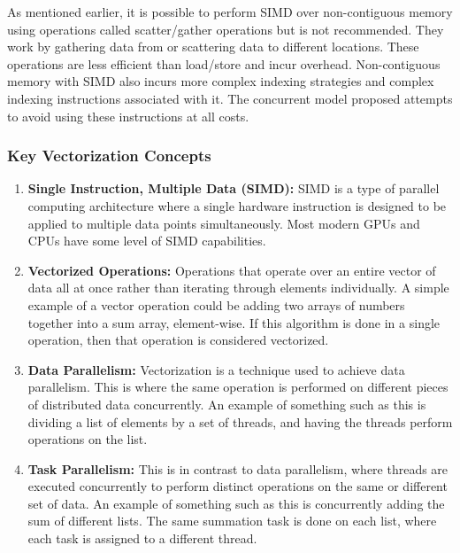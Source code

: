 As mentioned earlier, it is possible to perform SIMD over non-contiguous memory using operations called scatter/gather operations but is not recommended. They work by gathering data from or scattering data to different locations. These operations are less efficient than load/store and incur overhead. Non-contiguous memory with SIMD also incurs more complex indexing strategies and complex indexing instructions associated with it. The concurrent model proposed attempts to avoid using these instructions at all costs. \cite{Kusswurm_2022}

\subsubsection{Key Vectorization Concepts}
\begin{enumerate}
    \item \textbf{Single Instruction, Multiple Data (SIMD):} SIMD is a type of parallel computing architecture where a single hardware instruction is designed to be applied to multiple data points simultaneously. Most modern GPUs and CPUs have some level of SIMD capabilities.
    \item \textbf{Vectorized Operations:} Operations that operate over an entire vector of data all at once rather than iterating through elements individually. A simple example of a vector operation could be adding two arrays of numbers together into a sum array, element-wise. If this algorithm is done in a single operation, then that operation is considered vectorized.
    \item \textbf{Data Parallelism:} Vectorization is a technique used to achieve data parallelism. This is where the same operation is performed on different pieces of distributed data concurrently. An example of something such as this is dividing a list of elements by a set of threads, and having the threads perform operations on the list. 
    \item \textbf{Task Parallelism:} This is in contrast to data parallelism, where threads are executed concurrently to perform distinct operations on the same or different set of data. An example of something such as this is concurrently adding the sum of different lists. The same summation task is done on each list, where each task is assigned to a different thread. 
\end{enumerate}

